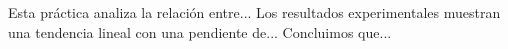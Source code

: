 Esta práctica analiza la relación entre... 
Los resultados experimentales muestran una tendencia lineal con una pendiente de... 
Concluimos que...